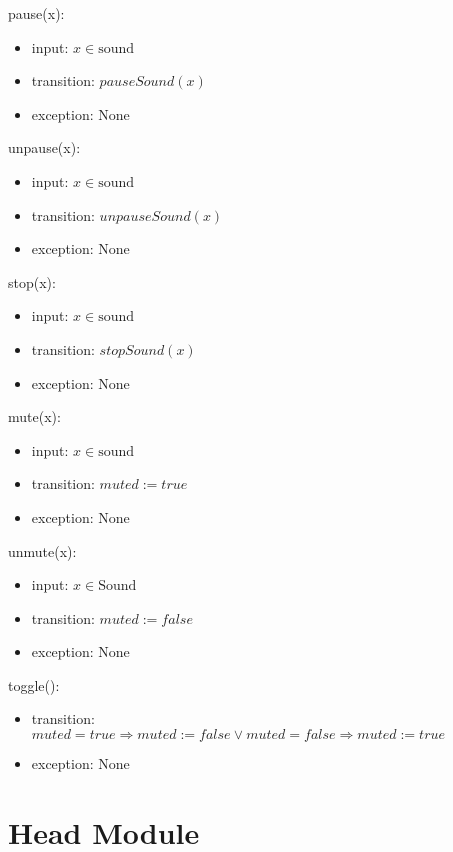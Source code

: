 \documentclass[12pt]{article}
\begin{document}
\noindent pause(x):
\begin{itemize}
  \item input: $x \in \mbox{sound}$
  \item transition: $pauseSound(x)$
  \item exception: None
\end{itemize}

\noindent unpause(x):
\begin{itemize}
  \item input: $x \in \mbox{sound}$
  \item transition: $unpauseSound(x)$
  \item exception: None
\end{itemize}

\noindent stop(x):
\begin{itemize}
  \item input: $x \in \mbox{sound}$
  \item transition: $stopSound(x)$
  \item exception: None
\end{itemize}

\noindent mute(x):
\begin{itemize}
  \item input: $x \in \mbox{sound}$
  \item transition: $muted := true$
  \item exception: None
\end{itemize}

\noindent unmute(x):
\begin{itemize}
  \item input: $x \in \mbox{Sound}$
  \item transition: $muted := false$
  \item exception: None
\end{itemize}

\noindent toggle():
\begin{itemize}
  \item transition: $muted = true \Rightarrow muted := false \lor muted = false \Rightarrow muted := true$
  \item exception: None
\end{itemize}

\newpage

\section*{Head Module}
\end{document}
